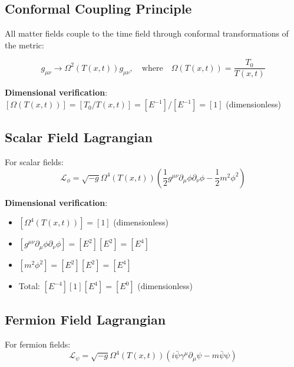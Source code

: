 \documentclass[12pt,a4paper]{article}
\newcommand{\Tfield}{T(x,t)}
\newcommand{\Tzero}{T_0}
\theoremstyle{definition}
\theoremstyle{remark}
\begin{document}
	\subsection{Conformal Coupling Principle}
	\label{subsec:conformal_coupling}
	
	All matter fields couple to the time field through conformal transformations of the metric:
	
	\begin{equation}
		g_{\mu\nu} \to \Omega^2(\Tfield) g_{\mu\nu}, \quad \text{where} \quad \Omega(\Tfield) = \frac{\Tzero}{\Tfield}
		\label{eq:conformal_transformation}
	\end{equation}
	
	\textbf{Dimensional verification}: $[\Omega(\Tfield)] = [\Tzero/\Tfield] = [E^{-1}]/[E^{-1}] = [1]$ (dimensionless) \checkmark
	
	\subsection{Scalar Field Lagrangian}
	\label{subsec:scalar_field_lagrangian}
	
	For scalar fields:
	\begin{equation}
		\mathcal{L}_\phi = \sqrt{-g} \Omega^4(\Tfield) \left(\frac{1}{2} g^{\mu\nu} \partial_\mu \phi \partial_\nu \phi - \frac{1}{2} m^2 \phi^2\right)
		\label{eq:scalar_lagrangian}
	\end{equation}
	
	\textbf{Dimensional verification}:
	\begin{itemize}
		\item $[\Omega^4(\Tfield)] = [1]$ (dimensionless)
		\item $[g^{\mu\nu} \partial_\mu \phi \partial_\nu \phi] = [E^2][E^2] = [E^4]$
		\item $[m^2 \phi^2] = [E^2][E^2] = [E^4]$
		\item Total: $[E^{-4}][1][E^4] = [E^0]$ (dimensionless) \checkmark
	\end{itemize}
	
	\subsection{Fermion Field Lagrangian}
	\label{subsec:fermion_field_lagrangian}
	
	For fermion fields:
	\begin{equation}
		\mathcal{L}_\psi = \sqrt{-g} \Omega^4(\Tfield) \left(i\bar{\psi}\gamma^\mu\partial_\mu\psi - m\bar{\psi}\psi\right)
		\label{eq:fermion_lagrangian}
	\end{equation}
	
\end{document}
